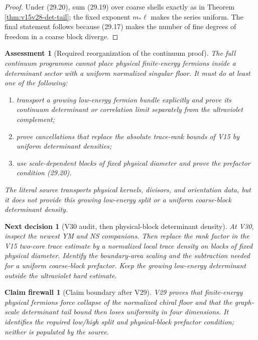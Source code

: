 \documentclass[11pt]{article}
\newtheorem{firewall}[theorem]{Claim firewall}
\newtheorem{decision}[theorem]{Next decision}
\newtheorem{assessment}[theorem]{Assessment}
\theoremstyle{remark}
\begin{document}
\begin{proof}
Under (29.20), sum (29.19) over coarse shells exactly as in Theorem
\ref{thm:v15v28-det-tail}; the fixed exponent
\(m_*\ell\) makes the series uniform.  The final statement follows
because (29.17) makes the number of fine degrees of freedom in a
coarse block diverge.
\end{proof}

\begin{assessment}[Required reorganization of the continuum proof]
\label{ass:v15v29-reorganization}
The full continuum programme cannot place physical finite-energy
fermions inside a determinant sector with a uniform normalized
singular floor.  It must do at least one of the following:
\begin{enumerate}
\item transport a growing low-energy fermion bundle explicitly and
      prove its continuum determinant or correlation limit
      separately from the ultraviolet complement;
\item prove cancellations that replace the absolute trace-rank
      bounds of V15 by uniform determinant densities;
\item use scale-dependent blocks of fixed physical diameter and
      prove the prefactor condition (29.20).
\end{enumerate}
The literal source transports physical kernels, divisors, and
orientation data, but it does not provide this growing low-energy
split or a uniform coarse-block determinant density.
\end{assessment}

\begin{decision}[V30 audit, then physical-block determinant density]
\label{dec:v15v29-next}
At V30, inspect the newest YM and NS companions.  Then replace the
rank factor in the V15 two-core trace estimate by a normalized local
trace density on blocks of fixed physical diameter.  Identify the
boundary-area scaling and the subtraction needed for a uniform
coarse-block prefactor.  Keep the growing low-energy determinant
outside the ultraviolet hard estimate.
\end{decision}

\begin{firewall}[Claim boundary after V29]
\label{fire:v15v29}
V29 proves that finite-energy physical fermions force collapse of
the normalized chiral floor and that the graph-scale determinant
tail bound then loses uniformity in four dimensions.  It identifies
the required low/high split and physical-block prefactor condition;
neither is populated by the source.
\end{firewall}
\end{document}

